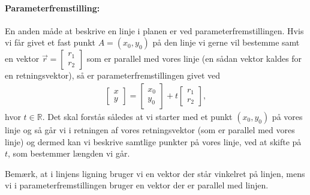 \paragraph*{Parameterfremstilling:}
En anden måde at beskrive en linje i planen er ved parameterfremstillingen. Hvis vi får givet et fast punkt $A=(x_0,y_0)$ på den linje vi gerne vil bestemme samt en vektor $\vec{r}=\begin{bmatrix}r_1\\r_2 \end{bmatrix}$ som er parallel med vores linje (en sådan vektor kaldes for en retningsvektor), så er parameterfremstillingen givet ved
\begin{align}\label{eq:vec2d2to}
\begin{bmatrix}x \\ y\end{bmatrix} = \begin{bmatrix}x_0 \\y_0\end{bmatrix}  +t
\begin{bmatrix}r_1 \\r_2 \end{bmatrix},
\end{align}
hvor $t \in \mathbb{R}$. Det skal forstås således at vi starter med et punkt $(x_0,y_0)$ på vores linje og så går vi i retningen af vores retningsvektor (som er parallel med vores linje) og dermed kan vi beskrive samtlige punkter på vores linje, ved at skifte på $t$, som bestemmer længden vi går.

Bemærk, at i linjens ligning bruger vi en vektor der står vinkelret på linjen, mens vi i parameterfremstillingen bruger en vektor der er parallel med linjen.

